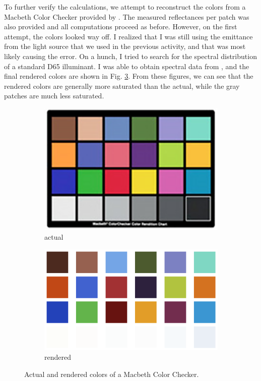 \documentclass[12pt,a4paper]{article}
\begin{document}
To further verify the calculations, we attempt to reconstruct the colors from a Macbeth Color Checker provided by \cite{soriano}. The measured reflectances per patch was also provided and all computations proceed as before. However, on the first attempt, the colors looked way off. I realized that I was still using the emittance from the light source that we used in the previous activity, and that was most likely causing the error. On a hunch, I tried to search for the spectral distribution of a standard D65 illuminant. I was able to obtain spectral data from \cite{d65}, and the final rendered colors are shown in Fig. \ref{fig:macbeth}. From these figures, we can see that the rendered colors are generally more saturated than the actual, while the gray patches are much less saturated.

\begin{figure}[htb]
	\centering
	\begin{subfigure}[h!]{0.45\textwidth}
		\includegraphics[width=\textwidth]{macbeth.png}
		\caption{actual}
		\label{fig:macbeth-actual}
	\end{subfigure}
	\begin{subfigure}[h!]{0.49\textwidth}
		\includegraphics[width=\textwidth]{mac_rendered.png}
		\caption{rendered}
		\label{fig:macbeth-render}
	\end{subfigure}
	\caption{Actual and rendered colors of a Macbeth Color Checker.}
	\label{fig:macbeth}
\end{figure}



\end{document}
